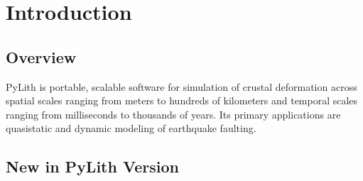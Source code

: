 \chapter{Introduction}


\section{Overview}

PyLith is portable, scalable software for simulation of crustal
deformation across spatial scales ranging from meters to hundreds of
kilometers and temporal scales ranging from milliseconds to thousands
of years. Its primary applications are quasistatic and dynamic
modeling of earthquake faulting.

\section{New in PyLith Version \pylithVersionNumber}
